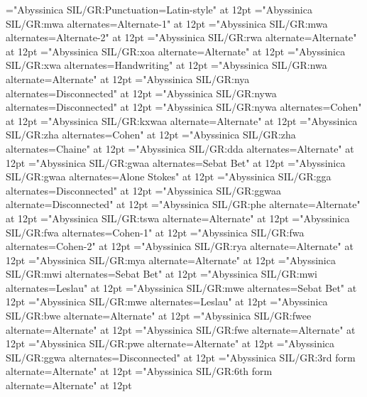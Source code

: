 \font\one="Abyssinica SIL/GR:Punctuation=Latin-style" at 12pt
\font\fourone="Abyssinica SIL/GR:mwa alternates=Alternate-1" at 12pt
\font\fourtwo="Abyssinica SIL/GR:mwa alternates=Alternate-2" at 12pt 
\font\five="Abyssinica SIL/GR:rwa alternate=Alternate" at 12pt
\font\seventeen="Abyssinica SIL/GR:xoa alternate=Alternate" at 12pt 
\font\eighteen="Abyssinica SIL/GR:xwa alternates=Handwriting" at 12pt 
\font\nineteen="Abyssinica SIL/GR:nwa alternate=Alternate" at 12pt
\font\twenty="Abyssinica SIL/GR:nya alternates=Disconnected" at 12pt 
\font\twentyoneone="Abyssinica SIL/GR:nywa alternates=Disconnected" at 12pt
\font\twentyonetwo="Abyssinica SIL/GR:nywa alternates=Cohen" at 12pt 
\font\twentysix="Abyssinica SIL/GR:kxwaa alternate=Alternate" at 12pt
\font\thirtyoneone="Abyssinica SIL/GR:zha alternates=Cohen" at 12pt
\font\thirtyonetwo="Abyssinica SIL/GR:zha alternates=Chaine" at 12pt 
\font\thirtytwo="Abyssinica SIL/GR:dda alternates=Alternate" at 12pt
\font\fortyone="Abyssinica SIL/GR:gwaa alternates=Sebat Bet" at 12pt
\font\fortytwo="Abyssinica SIL/GR:gwaa alternates=Alone Stokes" at 12pt 
\font\fortyoneone="Abyssinica SIL/GR:gga alternates=Disconnected" at 12pt
\font\fortytwoone="Abyssinica SIL/GR:ggwaa alternate=Disconnected" at 12pt
\font\fortyfive="Abyssinica SIL/GR:phe alternate=Alternate" at 12pt
\font\fortysix="Abyssinica SIL/GR:tswa alternate=Alternate" at 12pt
\font\fortyeightone="Abyssinica SIL/GR:fwa alternates=Cohen-1" at 12pt
\font\fortyeighttwo="Abyssinica SIL/GR:fwa alternates=Cohen-2" at 12pt 
\font\fortynine="Abyssinica SIL/GR:rya alternate=Alternate" at 12pt
\font\fifty="Abyssinica SIL/GR:mya alternate=Alternate" at 12pt
\font\sixtyone="Abyssinica SIL/GR:mwi alternates=Sebat Bet" at 12pt
\font\sixtytwo="Abyssinica SIL/GR:mwi alternates=Leslau" at 12pt 
\font\sixtyoneone="Abyssinica SIL/GR:mwe alternates=Sebat Bet" at 12pt
\font\sixtyonetwo="Abyssinica SIL/GR:mwe alternates=Leslau" at 12pt 
\font\sixtytwoone="Abyssinica SIL/GR:bwe alternate=Alternate" at 12pt
\font\sixtythree="Abyssinica SIL/GR:fwee alternate=Alternate" at 12pt
\font\sixtyfour="Abyssinica SIL/GR:fwe alternate=Alternate" at 12pt
\font\sixtyfive="Abyssinica SIL/GR:pwe alternate=Alternate" at 12pt 
\font\seventy="Abyssinica SIL/GR:ggwa alternates=Disconnected" at 12pt
\font\eighty="Abyssinica SIL/GR:3rd form alternate=Alternate" at 12pt
\font\eightyfive="Abyssinica SIL/GR:6th form alternate=Alternate" at 12pt

